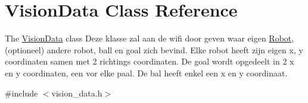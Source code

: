 \hypertarget{class_vision_data}{\section{Vision\-Data Class Reference}
\label{class_vision_data}
}


The \hyperlink{class_vision_data}{Vision\-Data} class Deze klasse zal aan de wifi door geven waar eigen \hyperlink{class_robot}{Robot}, (optioneel) andere robot, ball en goal zich bevind. Elke robot heeft zijn eigen x, y coordinaten samen met 2 richtings coordinaten. De goal wordt opgedeelt in 2 x en y coordinaten, een vor elke paal. De bal heeft enkel een x en y coordinaat.  




{\ttfamily \#include $<$vision\-\_\-data.\-h$>$}

